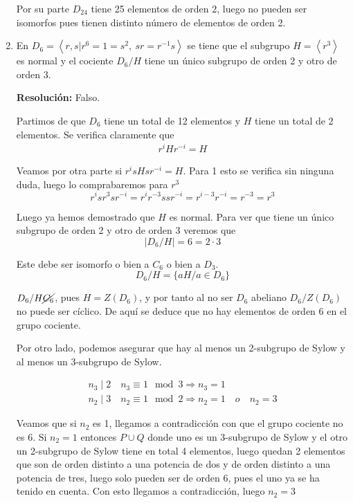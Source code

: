 \documentclass{article}
\begin{document}
\begin{enumerate}
Por su parte $D_{24}$ tiene 25 elementos de orden 2, luego no pueden ser isomorfos pues tienen distinto número de elementos de orden 2.

\item En $D_6=\left\langle r,s|r^6=1=s^2,\:sr=r^{-1}s\right\rangle$ se tiene que el subgrupo $H=\left\langle r^3\right\rangle$ es normal y el cociente $D_6/H$ tiene un único subgrupo de orden 2 y otro de orden 3.

\textbf{Resolución:} Falso.

Partimos de que $D_6$ tiene un total de 12 elementos y $H$ tiene un total de 2 elementos. Se verifica claramente que
\begin{gather*}
r^i Hr^{-i}=H
\end{gather*}

Veamos por otra parte si $r^isHsr^{-i}=H$. Para 1 esto se verifica sin ninguna duda, luego lo comprabaremos para $r^3$
\begin{equation*}
r^isr^3sr^{-i}=r^ir^{-3}ssr^{-i}=r^{i-3}r^{-i}=r^{-3}=r^3
\end{equation*}

Luego ya hemos demostrado que $H$ es normal. Para ver que tiene un único subgrupo de orden 2 y otro de orden 3 veremos que
\begin{equation*}
|D_6/H|=6=2\cdot 3
\end{equation*}

Este debe ser isomorfo o bien a $C_6$ o bien a $D_3$.
\begin{equation*}
D_6/H=\{aH/a\in D_6\}
\end{equation*}

$D_6/H\cancel{C_6}$, pues $H=Z(D_6)$, y por tanto al no ser $D_6$ abeliano $D_6/Z(D_6)$ no puede ser cíclico. De aquí se deduce que no hay elementos de orden 6 en el grupo cociente. 

Por otro lado, podemos asegurar que hay al menos un 2-subgrupo de Sylow y al menos un 3-subgrupo de Sylow.

\begin{gather*}
n_3\mid 2\quad n_3\equiv 1\mod 3\Rightarrow n_3=1\\
n_2\mid 3\quad n_2\equiv 1\mod 2\Rightarrow n_2=1\quad o\quad n_2=3
\end{gather*}

Veamos que si $n_2$ es 1, llegamos a contradicción con que el grupo cociente no es 6. Si $n_2=1$ entonces $P\cup Q$ donde uno es un 3-subgrupo de Sylow y el otro un 2-subgrupo de Sylow tiene en total 4 elementos, luego quedan 2 elementos que son de orden distinto a una potencia de dos y de orden distinto a una potencia de tres, luego solo pueden ser de orden 6, pues el uno ya se ha tenido en cuenta. Con esto llegamos a contradicción, luego $n_2=3$




\end{enumerate}
\end{document}
